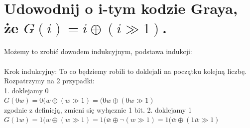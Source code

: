 \documentclass{article}
\begin{document}
\section{Udowodnij o i-tym kodzie Graya, że $G(i) = i \oplus (i \gg 1)$.}

Możemy to zrobić dowodem indukcyjnym, podstawa indukcji:\\
\\
Krok indukcyjny:
To co będziemy robili to doklejali na początku kolejną liczbę. Rozpatrzymy na 2 przypadki:\\
1. doklejamy 0\\
	$G(0w) = 0(w \oplus (w \gg 1)= (0w \oplus (0w \gg 1)$\\
	zgodnie z definicją, zmieni się wyłącznie 1 bit.
2. doklejamy 1\\
	$G(1w) = 1(w \oplus (w \gg 1)= 1(\bar w \oplus \neg(w \gg 1) = 1(\bar w \oplus (1\bar w \gg 1)$\
\end{document}
